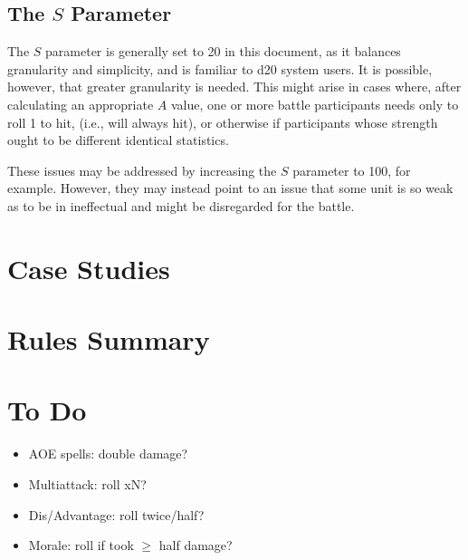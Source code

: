\documentclass[twocolumn]{article}
\begin{document}
\subsection{The $S$ Parameter}
The $S$ parameter is generally set to 20 in this document,
as it balances granularity and simplicity,
and is familiar to d20 system users.
It is possible, however, that greater granularity is needed.
This might arise in cases where,
after calculating an appropriate $A$ value,
one or more battle participants needs only to roll 1 to hit,
(i.e., will always hit),
or otherwise if participants whose strength ought to be different
identical statistics.

These issues may be addressed by increasing the $S$ parameter to 100,
for example.
However, they may instead point to an issue that some unit
is so weak as to be in ineffectual and might be disregarded for the battle.

\section{Case Studies}

\section{Rules Summary}

\section{To Do}
\begin{itemize}
    \item AOE spells: double damage?
    \item Multiattack: roll xN?
    \item Dis/Advantage: roll twice/half?
    \item Morale: roll if took $\geq$ half damage?
\end{itemize}
\end{document}
